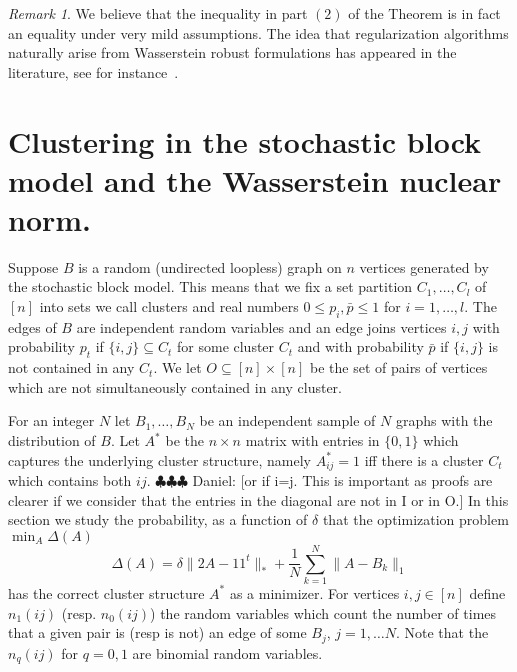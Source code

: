 \documentclass[12pt]{amsart}
\theoremstyle{remark}
\newtheorem{remark}[lemma]{Remark}
\newcommand{\ddr}[1]{{\color{blue} \sf $\clubsuit\clubsuit\clubsuit$ Daniel: [#1]}}
\begin{document}
\begin{remark} We believe that the inequality in part $(2)$ of the Theorem is in fact an equality under very mild assumptions. The idea that regularization algorithms naturally arise from Wasserstein robust formulations has appeared in the literature, see for instance~\cite{ColumbiaAlvaro}.
\end{remark}



\section{Clustering in the stochastic block model and the Wasserstein nuclear norm.}
\label{Clustering}

Suppose $B$ is a random (undirected loopless) graph on $n$ vertices generated by the stochastic block model. This means that we fix a set partition $C_1,\dots, C_l$ of $[n]$ into sets we call clusters and real numbers $0\leq p_i,\bar{p}\leq 1$ for $i=1,\dots, l$. The edges of $B$ are independent random variables and an edge joins vertices $i,j$ with probability $p_t$ if $\{i,j\}\subseteq C_t$ for some cluster $C_t$ and with probability $\bar{p}$ if $\{i,j\}$ is not contained in any $C_t$. We let $O\subseteq [n]\times [n]$ be the set of pairs of vertices which are not simultaneously contained in any cluster. 

For an integer $N$ let $B_1,\dots, B_N$ be an independent sample of $N$ graphs with the distribution of $B$. Let $A^*$ be the $n\times n$ matrix with entries in $\{0,1\}$ which captures the underlying cluster structure, namely $A^*_{ij}=1$ iff there is a cluster $C_t$ which contains both $ij$.
\ddr{or if i=j. This is important as proofs are clearer if we consider that the entries in the diagonal are not in I or in O.}
In this section we study the probability, as a function of $\delta$ that the optimization problem $\min_A\Delta(A)$
\[\Delta(A)= \delta\|2A-11^t\|_{*}+\frac{1}{N}\sum_{k=1}^N\|A-B_k\|_1\] 
has the correct cluster structure $A^*$ as a minimizer. For vertices $i,j\in [n]$ define $n_1(ij)$ (resp. $n_0(ij)$) the random variables which count the number of times that a given pair is (resp is not) an edge of some $B_j$, $j=1,\dots N$. Note that the $n_q(ij)$ for $q=0,1$ are binomial random variables.  
\end{document}
